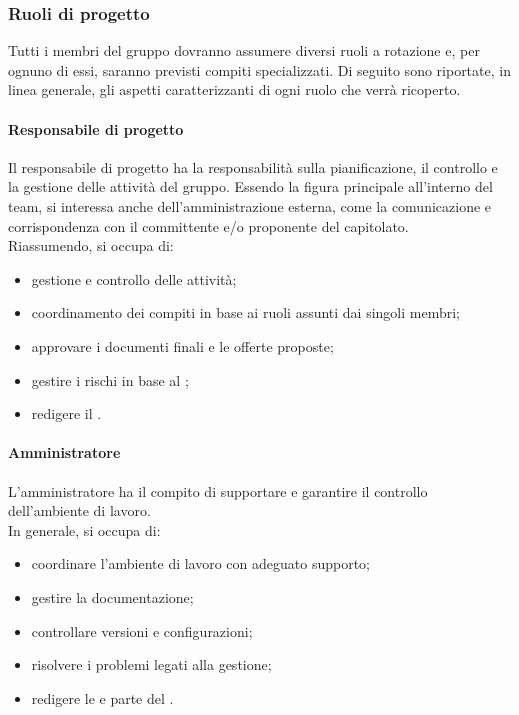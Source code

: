 	\subsubsection{Ruoli di progetto}
	Tutti i membri del gruppo dovranno assumere diversi ruoli a rotazione e, per ognuno di essi, saranno previsti compiti specializzati. Di seguito sono riportate, in linea generale, gli aspetti caratterizzanti di ogni ruolo che verrà ricoperto.

		\paragraph{Responsabile di progetto}
		Il responsabile di progetto ha la responsabilità sulla pianificazione, il controllo e la gestione delle attività del gruppo. Essendo la figura principale all'interno del team, si interessa anche dell'amministrazione esterna, come la comunicazione e corrispondenza con il committente e/o proponente del capitolato.\\
		Riassumendo, si occupa di:
		\begin{itemize}
			\item gestione e controllo delle attività;
			\item coordinamento dei compiti in base ai ruoli assunti dai singoli membri;
			\item approvare i documenti finali e le offerte proposte;
			\item gestire i rischi in base al ;
			\item redigere il .
		\end{itemize}

		\paragraph{Amministratore}
		L'amministratore ha il compito di supportare e garantire il controllo dell'ambiente di lavoro. \\
		In generale, si occupa di:
		\begin{itemize}
			\item coordinare l'ambiente di lavoro con adeguato supporto;
			\item gestire la documentazione;
			\item controllare versioni e configurazioni;
			\item risolvere i problemi legati alla gestione;
			\item redigere le  e parte del .
		\end{itemize}

